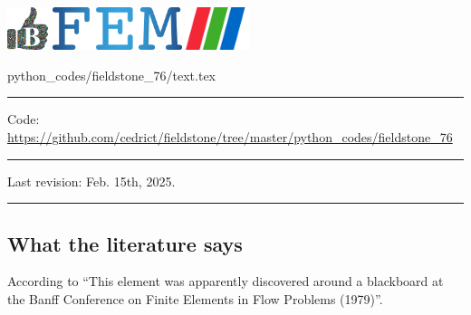 \noindent
\includegraphics[height=1.25cm]{images/pictograms/benchmark}
\includegraphics[height=1.25cm]{images/pictograms/FEM}
\includegraphics[height=1.25cm]{images/pictograms/paraview}


\begin{flushright} {\tiny {\color{gray} python\_codes/fieldstone\_76/text.tex}} \end{flushright}


\par\noindent\rule{\textwidth}{0.4pt}

\begin{center}
\inpython \hspace{0.5cm}
{\small Code: \url{https://github.com/cedrict/fieldstone/tree/master/python_codes/fieldstone_76}}
\end{center}


\par\noindent\rule{\textwidth}{0.4pt}

Last revision: Feb. 15th, 2025.

\par\noindent\rule{\textwidth}{0.4pt}


\subsection*{What the literature says}

According to \textcite{bobf08} 
{\color{darkgray} ``This element was apparently discovered 
around a blackboard at the Banff Conference on Finite Elements in 
Flow Problems (1979)''}.

